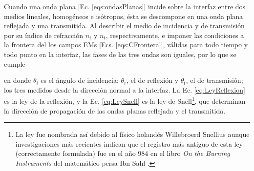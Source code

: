 Cuando una onda plana [Ec. \eqref{eqs:ondasPlanas}] incide sobre la interfaz entre dos medios lineales, homogéneos e isótropos, ésta se descompone en una onda plana reflejada y una transmitida. Al describir el medio de incidencia y de transmisión por su índice de refracción $n_i$ y $n_t$, respectivamente, e imponer las condiciones a la frontera del los campos EMs [Ecs. \eqref{eqs:CFrontera}], válidas para todo tiempo y todo punto en la interfaz, las fases de las tres ondas son iguales, por lo que se cumple \vspace*{-.75em} 
%
	\begin{tcolorbox}[title = Ley de la reflexión y ley de Snell ]
	\end{tcolorbox}	 \vspace*{-.75em}\noindent
%
en donde $\theta_i$ es el ángulo de incidencia; $\theta_r$, el de reflexión y $\theta_t$, el de transmisión; los tres medidos desde la dirección normal a la interfaz. La Ec. \eqref{eq:LeyReflexion} es la ley de la reflexión, y la Ec. \eqref{eq:LeySnell} es la ley de Snell\footnote{La ley fue nombrada así debido al físico holandés Willebroerd Snellius aunque investigaciones más recientes indican que el registro más antiguo de esta ley (correctamente formulada) fue en el año 984 en el libro \emph{On the Burning Instruments} del matemático persa Ibn Sahl \cite{kwan2002really}.}, que determinan la dirección de propagación de las ondas planas reflejada y el transmitida.

